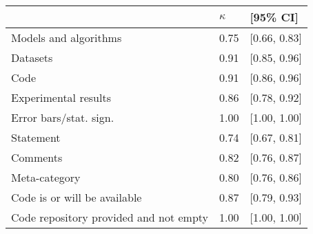 \begin{tabular}{lll}
\hline
& $\kappa$ & [95\% CI]\\
\hline
Models and algorithms & 0.75 & [0.66, 0.83]  \\
Datasets & 0.91 & [0.85, 0.96]  \\
Code & 0.91 & [0.86, 0.96]  \\
Experimental results & 0.86 & [0.78, 0.92]  \\
Error bars/stat. sign.& 1.00 & [1.00, 1.00]  \\
Statement & 0.74 & [0.67, 0.81]  \\
Comments & 0.82  & [0.76, 0.87]  \\
Meta-category & 0.80  & [0.76, 0.86]  \\
Code is or will be available & 0.87 & [0.79, 0.93]  \\
Code repository provided and not empty & 1.00 & [1.00, 1.00]  \\
\hline
\end{tabular}
